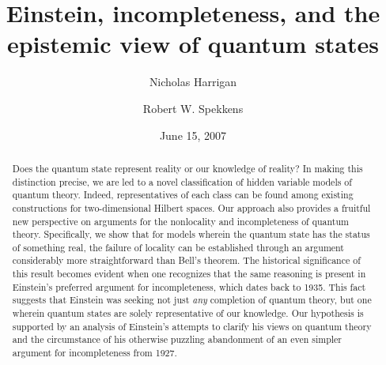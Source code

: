 \documentclass[aps,nofootinbib,12pt]{revtex4-2}
\begin{document}
\title{Einstein, incompleteness, and the epistemic view of quantum states}
\author{Nicholas Harrigan}
\author{Robert W. Spekkens}
\date{June 15, 2007}




\begin{abstract}
Does the quantum state represent reality or our knowledge of
reality? In making this distinction precise, we are led to a novel
classification of hidden variable models of quantum theory. Indeed,
representatives of each class can be found among existing
constructions for two-dimensional Hilbert spaces. Our approach also
provides a fruitful new perspective on arguments for the nonlocality
and incompleteness of quantum theory. Specifically, we show that for
models wherein the quantum state has the status of something real,
the failure of locality can be established through an argument
considerably more straightforward than Bell's theorem. The
historical significance of this result becomes evident when one
recognizes that the same reasoning is present in Einstein's
preferred argument for incompleteness, which dates back to 1935.
This fact suggests that Einstein was seeking not just \textit{any}
completion of quantum theory, but one wherein quantum states are
solely representative of our knowledge. Our hypothesis is supported
by an analysis of Einstein's attempts to clarify his views on
quantum theory and the circumstance of his otherwise puzzling
abandonment of an even simpler argument for incompleteness from
1927.
\end{abstract}

\end{document}
